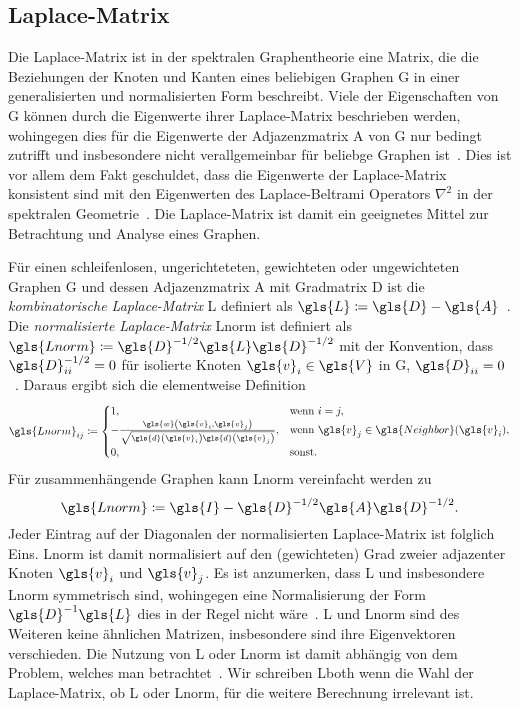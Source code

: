 \subsection{Laplace-Matrix}
\label{laplace_matrix}

Die Laplace-Matrix ist in der spektralen Graphentheorie eine Matrix, die die Beziehungen der Knoten und Kanten eines beliebigen Graphen \gls{G} in einer generalisierten und normalisierten Form beschreibt.
Viele der Eigenschaften von \gls{G} können durch die Eigenwerte ihrer Laplace-Matrix beschrieben werden, wohingegen dies \bspw{} für die Eigenwerte der Adjazenzmatrix \gls{A} von \gls{G} nur bedingt zutrifft und insbesondere nicht verallgemeinbar für beliebge Graphen ist~\cite{Chung}.
Dies ist vor allem dem Fakt geschuldet, dass die Eigenwerte der Laplace-Matrix konsistent sind mit den Eigenwerten des Laplace-Beltrami Operators $\nabla^2$ in der spektralen Geometrie~\cite{Chung}.
Die Laplace-Matrix ist damit ein geeignetes Mittel zur Betrachtung und Analyse eines Graphen.

Für einen schleifenlosen, ungerichteteten, gewichteten oder ungewichteten Graphen \gls{G} und dessen Adjazenzmatrix \gls{A} mit Gradmatrix \gls{D} ist die \emph{kombinatorische Laplace-Matrix} \gls{L} definiert als $\gls{L} \coloneqq \gls{D} - \gls{A}$~\cite{Chung}.
Die \emph{normalisierte Laplace-Matrix} \gls{Lnorm} ist definiert als $\gls{Lnorm} \coloneqq \gls{D}^{-1/2} \gls{L} \gls{D}^{-1/2}$ mit der Konvention, dass $\gls{D}^{-1/2}_{ii} = 0$ für isolierte Knoten $\gls{v}_i \in \gls{V}$ in \gls{G}, \dhe{} $\gls{D}_{ii} = 0$~\cite{Chung}.
Daraus ergibt sich die elementweise Definition
\begin{equation*}
  \gls{Lnorm}_{ij} \coloneqq \begin{cases}
  1, & \text{wenn }i = j,\\
    -\frac{\gls{w}\left(\gls{v}_i, \gls{v}_j\right)}{\sqrt{\gls{d}\left(\gls{v}_i\right)\gls{d}\left(\gls{v}_j\right)}}, & \text{wenn }\gls{v}_j \in \gls{Neighbor}\left(\gls{v}_i\right),\\
  0, & \text{sonst.}
\end{cases}
\end{equation*}
Für zusammenhängende Graphen kann \gls{Lnorm} vereinfacht werden zu~\cite{Chung}
\begin{equation}
  \gls{Lnorm} \coloneqq \gls{I} - \gls{D}^{-1/2} \gls{A} \gls{D}^{-1/2}.
  \label{eq:laplace_norm_connected}
\end{equation}
Jeder Eintrag auf der Diagonalen der normalisierten Laplace-Matrix ist folglich Eins.
\gls{Lnorm} ist damit normalisiert auf den (gewichteten) Grad zweier adjazenter Knoten $\gls{v}_i$ und $\gls{v}_j$.
Es ist anzumerken, dass \gls{L} und insbesondere \gls{Lnorm} symmetrisch sind, wohingegen eine Normalisierung der Form $\gls{D}^{-1}\gls{L}$ dies in der Regel nicht wäre~\cite{Reuter}.
\gls{L} und \gls{Lnorm} sind des Weiteren keine ähnlichen Matrizen, insbesondere sind ihre Eigenvektoren verschieden.
Die Nutzung von \gls{L} oder \gls{Lnorm} ist damit abhängig von dem Problem, welches man betrachtet~\cite{Hammond}.
Wir schreiben \gls{Lboth} wenn die Wahl der Laplace-Matrix, ob \gls{L} oder \gls{Lnorm}, für die weitere Berechnung irrelevant ist.

